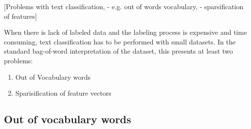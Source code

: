 [Problems with text classification, 
	- e.g. out of words vocabulary,
	- sparsification of features]
	
When there is lack of labeled data and the labeling process is expensive and time consuming, text classification has to be performed with small datasets. In the standard bag-of-word interpretation of the dataset, this presents at least two problems:

\begin{enumerate}
	\item Out of Vocabulary words
	\item Sparisification of feature vectors
\end{enumerate}

\subsection{Out of vocabulary words}


\label{sec:problem-statement}